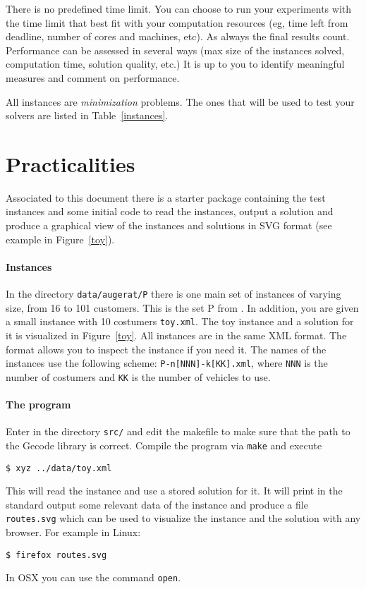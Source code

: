  
There is no predefined time limit. You can choose to run your
experiments with the time limit that best fit with your computation
resources (eg, time left from deadline, number of cores and machines,
etc).  As always the final results count. Performance can be assessed in
several ways (max size of the instances solved, computation time,
solution quality, etc.) It is up to you to identify meaningful measures
and comment on performance.





All instances are \emph{minimization} problems. The ones that will be
used to test your solvers are listed in Table~\ref{instances}.




\section*{Practicalities}

Associated to this document there is a starter package
containing the test instances and some initial code to read the
instances, output a solution and produce a graphical view of the
instances and solutions in SVG format (see example in Figure~\ref{toy}).

\paragraph{Instances}
In the directory \texttt{data/augerat/P} there is one main set of
instances of varying size, from 16 to 101 customers. This is the set P
from \cite{Augerat1995}. In addition, you are given a small instance
with 10 costumers \texttt{toy.xml}. The toy instance and a solution for
it is visualized in Figure~\ref{toy}.
All instances are in the same XML format. The format allows you to
inspect the instance if you need it. The names of the instances use the
following scheme: \texttt{P-n[NNN]-k[KK].xml}, where \texttt{NNN} is the
number of costumers and \texttt{KK} is the number of vehicles to use.

\paragraph{The program}

Enter in the directory \texttt{src/} and edit the makefile to make sure
that the path to the Gecode library is correct.  Compile the program via
\texttt{make} and execute
\begin{verbatim}
$ xyz ../data/toy.xml 
\end{verbatim}
This will read the instance and use a stored solution for it. It will
print in the standard output some relevant data of the instance and
produce a file \texttt{routes.svg} which can be used to visualize the
instance and the solution with any browser. For example in Linux:
\begin{verbatim}
$ firefox routes.svg
\end{verbatim}
In OSX you can use the command \texttt{open}.  

